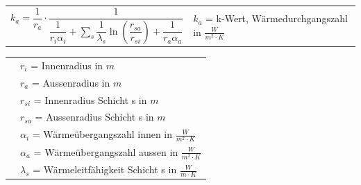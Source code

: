 			\begin{minipage}{12cm}
					\renewcommand{\arraystretch}{2.5}
					\begin{tabular}{ p{7cm} | p{7cm}}
						$k_a = \dfrac{1}{r_a} \cdot \dfrac{1}{\dfrac{1}{r_i \alpha_i} + \sum\limits_{s}\dfrac{1}{\lambda_s} \ln(\dfrac{r_{sa}}{r_{si}}) + \dfrac{1}{r_a \alpha_a}}$	&	$k_a$ = k-Wert, Wärmedurchgangszahl in $\frac{W}{m^2 \cdot K}$\\
					\end{tabular}
					\renewcommand{\arraystretch}{1.5}
					\begin{tabular}{ p{7cm} | p{7cm} }
						& $r_i$ = Innenradius in $m$\\
						& $r_a$ = Aussenradius in $m$\\
						& $r_{si}$ = Innenradius Schicht s in $m$\\
						& $r_{sa}$ = Aussenradius Schicht s in $m$\\
						& $\alpha_i$ = Wärmeübergangszahl innen in $\frac{W}{m^2 \cdot K}$\\
						& $\alpha_a$ = Wärmeübergangszahl aussen in $\frac{W}{m^2 \cdot K}$\\
						& $\lambda_s$ = Wärmeleitfähigkeit Schicht s in $\frac{W}{m \cdot K}$\\
					\end{tabular} 
					\renewcommand{\arraystretch}{1}
			\end{minipage}
			\newline
			\newline
			\newline
